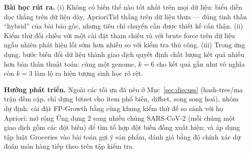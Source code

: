\documentclass[10pt,twocolumn,letterpaper]{article}
\begin{document}
\textbf{Bài học rút ra.} (i) Không có biến thể nào tốt nhất trên mọi dữ liệu: biểu diễn dọc thắng trên dữ liệu dày, AprioriTid thắng trên dữ liệu thưa — đúng tinh thần ``hybrid'' của bài báo gốc, nhưng tiêu chí chuyển cần được thiết kế cẩn thận. (ii) Kiểm thử đối chiếu với một cài đặt tham chiếu và với brute force trên dữ liệu ngẫu nhiên phát hiện lỗi sớm hơn nhiều so với kiểm tra thủ công. (iii) Trong ứng dụng, bước biến đổi dữ liệu thành giao dịch quyết định chất lượng kết quả nhiều hơn bản thân thuật toán: cùng một genome, $k=6$ cho kết quả gần như vô nghĩa còn $k=3$ làm lộ ra hiện tượng sinh học rõ rệt.

\textbf{Hướng phát triển.} Ngoài các tối ưu đã nêu ở Mục~\ref{sec:discuss} (hash-tree/ma trận đếm cặp, chỉ dựng bitset cho item phổ biến, diffset, song song hoá), nhóm dự định: cài đặt FP-Growth bằng cùng khung kiểm thử để so sánh với họ Apriori; mở rộng Ứng dụng 2 sang nhiều chủng SARS-CoV-2 (mỗi chủng một giao dịch gồm các đột biến) để tìm tổ hợp đột biến đồng xuất hiện; và áp dụng tập luật Groceries vào bài toán gợi ý sản phẩm, đánh giá bằng độ chính xác dự đoán món hàng tiếp theo trên tập kiểm tra.
\end{document}
